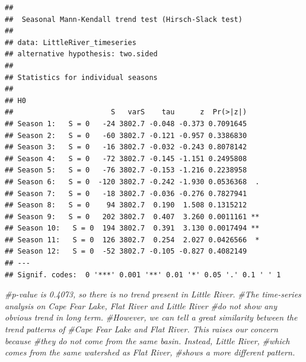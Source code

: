 \documentclass[
  12pt,
]{article}
\newenvironment{Shaded}{\begin{snugshade}}{\end{snugshade}}
\newcommand{\AttributeTok}[1]{\textcolor[rgb]{0.77,0.63,0.00}{#1}}
\newcommand{\CommentTok}[1]{\textcolor[rgb]{0.56,0.35,0.01}{\textit{#1}}}
\newcommand{\DecValTok}[1]{\textcolor[rgb]{0.00,0.00,0.81}{#1}}
\newcommand{\FunctionTok}[1]{\textcolor[rgb]{0.00,0.00,0.00}{#1}}
\newcommand{\NormalTok}[1]{#1}
\newcommand{\OtherTok}[1]{\textcolor[rgb]{0.56,0.35,0.01}{#1}}
\newcommand{\SpecialCharTok}[1]{\textcolor[rgb]{0.00,0.00,0.00}{#1}}
\newcommand{\StringTok}[1]{\textcolor[rgb]{0.31,0.60,0.02}{#1}}
\begin{document}
\begin{verbatim}
## 
##  Seasonal Mann-Kendall trend test (Hirsch-Slack test)
## 
## data: LittleRiver_timeseries
## alternative hypothesis: two.sided
## 
## Statistics for individual seasons
## 
## H0
##                       S   varS    tau      z  Pr(>|z|)   
## Season 1:   S = 0   -24 3802.7 -0.048 -0.373 0.7091645   
## Season 2:   S = 0   -60 3802.7 -0.121 -0.957 0.3386830   
## Season 3:   S = 0   -16 3802.7 -0.032 -0.243 0.8078142   
## Season 4:   S = 0   -72 3802.7 -0.145 -1.151 0.2495808   
## Season 5:   S = 0   -76 3802.7 -0.153 -1.216 0.2238958   
## Season 6:   S = 0  -120 3802.7 -0.242 -1.930 0.0536368  .
## Season 7:   S = 0   -18 3802.7 -0.036 -0.276 0.7827941   
## Season 8:   S = 0    94 3802.7  0.190  1.508 0.1315212   
## Season 9:   S = 0   202 3802.7  0.407  3.260 0.0011161 **
## Season 10:   S = 0  194 3802.7  0.391  3.130 0.0017494 **
## Season 11:   S = 0  126 3802.7  0.254  2.027 0.0426566  *
## Season 12:   S = 0  -52 3802.7 -0.105 -0.827 0.4082149   
## ---
## Signif. codes:  0 '***' 0.001 '**' 0.01 '*' 0.05 '.' 0.1 ' ' 1
\end{verbatim}

\begin{Shaded}
\begin{Highlighting}[]
\CommentTok{\#p{-}value is 0.4073, so there is no trend present in Little River.}
\CommentTok{\#The time{-}series analysis on Cape Fear Lake, Flat River and Little River }
\CommentTok{\#do not show any obvious trend in long term. }
\CommentTok{\#However, we can tell a great similarity between the trend patterns of}
\CommentTok{\#Cape Fear Lake and Flat River. This raises our concern because }
\CommentTok{\#they do not come from the same basin. Instead, Little River, }
\CommentTok{\#which comes from the same watershed as Flat River, }
\CommentTok{\#shows a more different pattern.}
\end{Highlighting}
\end{Shaded}

\begin{Shaded}
\end{Shaded}
\end{document}
